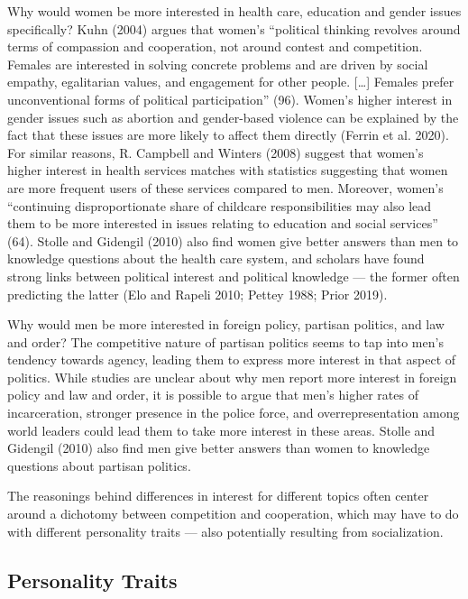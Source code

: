 \documentclass[
  letterpaper,
  DIV=11,
  numbers=noendperiod]{scrreprt}
\begin{document}
Why would women be more interested in health care, education and gender
issues specifically? Kuhn (2004) argues that women's ``political
thinking revolves around terms of compassion and cooperation, not around
contest and competition. Females are interested in solving concrete
problems and are driven by social empathy, egalitarian values, and
engagement for other people. {[}\ldots{]} Females prefer unconventional
forms of political participation'' (96). Women's higher interest in
gender issues such as abortion and gender-based violence can be
explained by the fact that these issues are more likely to affect them
directly (Ferrin et al. 2020). For similar reasons, R. Campbell and
Winters (2008) suggest that women's higher interest in health services
matches with statistics suggesting that women are more frequent users of
these services compared to men. Moreover, women's ``continuing
disproportionate share of childcare responsibilities may also lead them
to be more interested in issues relating to education and social
services'' (64). Stolle and Gidengil (2010) also find women give better
answers than men to knowledge questions about the health care system,
and scholars have found strong links between political interest and
political knowledge --- the former often predicting the latter (Elo and
Rapeli 2010; Pettey 1988; Prior 2019).

Why would men be more interested in foreign policy, partisan politics,
and law and order? The competitive nature of partisan politics seems to
tap into men's tendency towards agency, leading them to express more
interest in that aspect of politics. While studies are unclear about why
men report more interest in foreign policy and law and order, it is
possible to argue that men's higher rates of incarceration, stronger
presence in the police force, and overrepresentation among world leaders
could lead them to take more interest in these areas. Stolle and
Gidengil (2010) also find men give better answers than women to
knowledge questions about partisan politics.

The reasonings behind differences in interest for different topics often
center around a dichotomy between competition and cooperation, which may
have to do with different personality traits --- also potentially
resulting from socialization.

\subsection{Personality Traits}\label{personality-traits}
\end{document}
